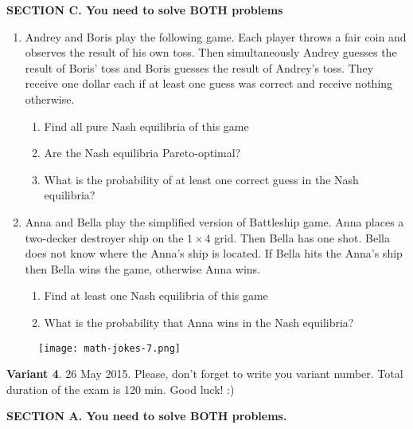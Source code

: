 \documentclass[12pt,a4paper]{article}
\begin{document}
\textbf{SECTION C. You need to solve BOTH problems }

\begin{enumerate}[resume]

\item Andrey and Boris play the following game. Each player throws a fair coin and observes the result of his own toss. Then simultaneously Andrey guesses the result of Boris' toss and Boris guesses the result of Andrey's toss. They receive one dollar each if at least one guess was correct and receive nothing otherwise. 

\begin{enumerate}
\item Find all pure Nash equilibria of this game
\item Are the Nash equilibria Pareto-optimal?
\item What is the probability of at least one correct guess in the Nash equilibria?
\end{enumerate}

\item Anna and Bella play the simplified version of Battleship game. Anna places a two-decker destroyer ship on the $1\times 4$ grid. Then Bella has one shot. Bella does not know where the Anna's ship is located. If Bella hits the Anna's ship then Bella wins the game, otherwise Anna wins. 

\begin{enumerate}
\item Find at least one Nash equilibria of this game
\item What is the probability that Anna wins in the Nash equilibria?
\end{enumerate}


\end{enumerate}

\begin{figure}[hbtp]
\centering
\texttt{[image: math-jokes-7.png]}
\end{figure}



\newpage
\thispagestyle{empty}
\textbf{Variant 4}. 26 May 2015. Please, don't forget to write you variant number. Total duration of the exam is 120 min. Good luck! :) 

\vspace{0.6cm}

\textbf{SECTION A. You need to solve BOTH problems.}
\end{document}
